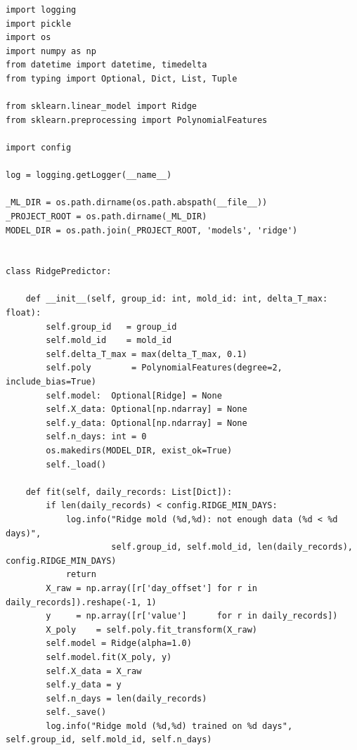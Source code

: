 \begin{lstlisting}
import logging
import pickle
import os
import numpy as np
from datetime import datetime, timedelta
from typing import Optional, Dict, List, Tuple

from sklearn.linear_model import Ridge
from sklearn.preprocessing import PolynomialFeatures

import config

log = logging.getLogger(__name__)

_ML_DIR = os.path.dirname(os.path.abspath(__file__))
_PROJECT_ROOT = os.path.dirname(_ML_DIR)
MODEL_DIR = os.path.join(_PROJECT_ROOT, 'models', 'ridge')


class RidgePredictor:

    def __init__(self, group_id: int, mold_id: int, delta_T_max: float):
        self.group_id   = group_id
        self.mold_id    = mold_id
        self.delta_T_max = max(delta_T_max, 0.1)
        self.poly        = PolynomialFeatures(degree=2, include_bias=True)
        self.model:  Optional[Ridge] = None
        self.X_data: Optional[np.ndarray] = None
        self.y_data: Optional[np.ndarray] = None
        self.n_days: int = 0
        os.makedirs(MODEL_DIR, exist_ok=True)
        self._load()

    def fit(self, daily_records: List[Dict]):
        if len(daily_records) < config.RIDGE_MIN_DAYS:
            log.info("Ridge mold (%d,%d): not enough data (%d < %d days)",
                     self.group_id, self.mold_id, len(daily_records), config.RIDGE_MIN_DAYS)
            return
        X_raw = np.array([r['day_offset'] for r in daily_records]).reshape(-1, 1)
        y     = np.array([r['value']      for r in daily_records])
        X_poly    = self.poly.fit_transform(X_raw)
        self.model = Ridge(alpha=1.0)
        self.model.fit(X_poly, y)
        self.X_data = X_raw
        self.y_data = y
        self.n_days = len(daily_records)
        self._save()
        log.info("Ridge mold (%d,%d) trained on %d days", self.group_id, self.mold_id, self.n_days)


\end{lstlisting}

